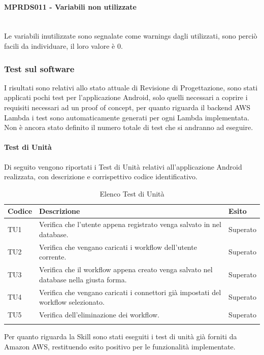 \paragraph{MPRDS011 - Variabili non utilizzate}\mbox{}\\[0.4cm]
Le variabili inutilizzate sono segnalate come warnings dagli  utilizzati, sono perciò facili da individuare, il loro valore è 0.
\subsubsection{Test sul software}
I risultati sono relativi allo stato attuale di Revisione di Progettazione, sono stati applicati pochi test per l'applicazione Android, solo quelli necessari a coprire i requisiti necessari ad un proof of concept, per quanto riguarda il backend AWS Lambda i test sono automaticamente generati per ogni Lambda implementata. Non è ancora stato definito il numero totale di test che si andranno ad eseguire.
\paragraph{Test di Unità}
\label{sec:tuRP}
Di seguito vengono riportati i Test di Unità relativi all'applicazione Android realizzata, con descrizione e corrispettivo codice identificativo.
\begin{center}
	\centering
	\renewcommand{\arraystretch}{1.5}
	\begin{longtable}{  p{1.5cm}  p{10.5cm} p{2cm}  }
		\rowcolor{tableHeadYellow}
		\textbf{Codice}   & \textbf{Descrizione} & \textbf{Esito} \\ 
		\endhead
		TU1 & Verifica che l’utente appena registrato venga salvato in nel database.  & Superato \\
		TU2 & Verifica che vengano caricati i workflow dell’utente corrente. & Superato \\
		TU3 & Verifica che il workflow appena creato venga salvato nel database nella giusta forma. & Superato \\
		TU4 & Verifica che vengano caricati i connettori già impostati del workflow selezionato. & Superato \\
		TU5 & Verifica dell’eliminazione dei workflow. & Superato \\
		\rowcolor{white}
		\caption{Elenco Test di Unità}
	\end{longtable}
\end{center}
Per quanto riguarda la Skill sono stati eseguiti i test di unità già forniti da Amazon AWS, restituendo esito positivo per le funzionalità implementate.
\pagebreak
